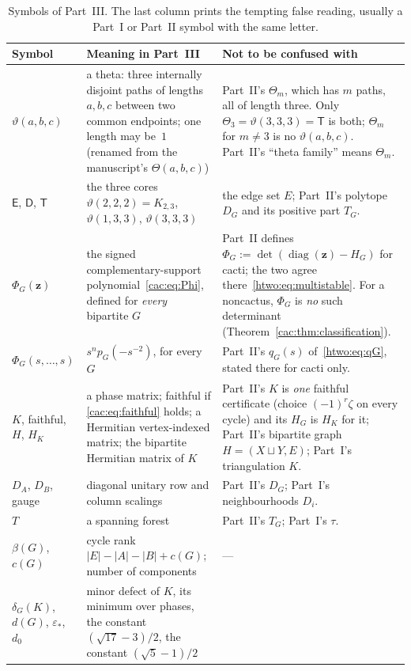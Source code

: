 \documentclass[11pt]{article}
\numberwithin{equation}{section}
\theoremstyle{definition}
\newcommand{\diag}{\operatorname{diag}}
\newcommand{\epsstar}{\varepsilon_*}
\newcommand{\Ecore}{\mathsf E}\newcommand{\Dcore}{\mathsf D}\newcommand{\Tcore}{\mathsf T}
\newcommand{\zv}{\mathbf z}
\begin{document}
\begin{table}[htbp]
\centering\small
\caption{Symbols of Part~III. The last column prints the tempting false
reading, usually a Part~I or Part~II symbol with the same letter.}
\label{cac:tab:notation}
\begin{tabularx}{\textwidth}{@{}>{\raggedright}p{}>{\raggedright}p{}Y@{}}
\toprule
Symbol & Meaning in Part~III & Not to be confused with\\
\midrule
$\vartheta(a,b,c)$ & a theta: three internally disjoint paths of lengths
 $a,b,c$ between two common endpoints; one length may be~$1$ (renamed from
 the manuscript's $\Theta(a,b,c)$) & Part~II's $\Theta_m$, which has $m$
 paths, all of length three. Only $\Theta_3=\vartheta(3,3,3)=\Tcore$
 is both; $\Theta_m$ for $m\ne3$ is no $\vartheta(a,b,c)$. Part~II's
 ``theta family'' means $\Theta_m$.\\
$\Ecore$, $\Dcore$, $\Tcore$ & the three cores
 $\vartheta(2,2,2)=K_{2,3}$, $\vartheta(1,3,3)$, $\vartheta(3,3,3)$ &
 the edge set $E$; Part~II's polytope $D_G$ and its positive part
 $T_G$.\\
$\Phi_G(\zv)$ & the signed complementary-support polynomial~\eqref{cac:eq:Phi},
 defined for \emph{every} bipartite $G$ & Part~II
 defines $\Phi_G:=\det(\diag(\mathbf z)-H_G)$ for cacti; the two agree
 there~\eqref{htwo:eq:multistable}. For a noncactus, $\Phi_G$ is
 \emph{no} such determinant (Theorem~\ref{cac:thm:classification}).\\
$\Phi_G(s,\ldots,s)$ & $s^np_G(-s^{-2})$, for every $G$ & Part~II's $q_G(s)$
 of~\eqref{htwo:eq:qG}, stated there for cacti only.\\
$K$, faithful, $H$, $H_K$ & a phase matrix; faithful if
 \eqref{cac:eq:faithful} holds; a Hermitian vertex-indexed matrix; the
 bipartite Hermitian matrix of $K$ & Part~II's $K$ is \emph{one} faithful
 certificate (choice $(-1)^r\zeta$ on every cycle) and its $H_G$ is
 $H_K$ for it; Part~II's bipartite graph $H=(X\sqcup Y,E)$; Part~I's
 triangulation $K$.\\
$D_A$, $D_B$, gauge & diagonal unitary row and column scalings & Part~II's
 $D_G$; Part~I's neighbourhoods $D_i$.\\
$T$ & a spanning forest & Part~II's $T_G$; Part~I's $\tau$.\\
$\beta(G)$, $c(G)$ & cycle rank $|E|-|A|-|B|+c(G)$; number of components &
 ---\\
$\delta_G(K)$, $d(G)$, $\epsstar$, $d_0$ & minor defect of $K$, its minimum
 over phases, the constant $(\sqrt{17}-3)/2$, the constant $(\sqrt5-1)/2$ &

\end{tabularx}
\end{table}
\end{document}
